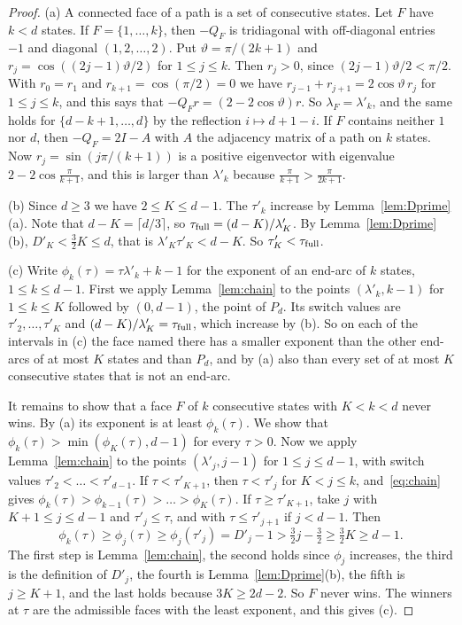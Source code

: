 \begin{proof}
(a) A connected face of a path is a set of consecutive states. Let $F$ have
$k<d$ states. If $F=\{1,\dots,k\}$, then $-Q_F$ is tridiagonal with
off-diagonal entries $-1$ and diagonal $(1,2,\dots,2)$. Put
$\vartheta=\pi/(2k+1)$ and $r_j=\cos((2j-1)\vartheta/2)$ for $1\le j\le k$.
Then $r_j>0$, since $(2j-1)\vartheta/2<\pi/2$. With $r_0=r_1$ and
$r_{k+1}=\cos(\pi/2)=0$ we have $r_{j-1}+r_{j+1}=2\cos\vartheta\,r_j$ for
$1\le j\le k$, and this says that $-Q_Fr=(2-2\cos\vartheta)r$. So
$\lambda_F=\lambda'_k$, and the same holds for $\{d-k+1,\dots,d\}$ by the
reflection $i\mapsto d+1-i$. If $F$ contains neither $1$ nor $d$, then
$-Q_F=2I-A$ with $A$ the adjacency matrix of a path on $k$ states. Now
$r_j=\sin(j\pi/(k+1))$ is a positive eigenvector with eigenvalue
$2-2\cos\frac\pi{k+1}$, and this is larger than $\lambda'_k$ because
$\frac\pi{k+1}>\frac\pi{2k+1}$.

(b) Since $d\ge3$ we have $2\le K\le d-1$. The $\tau'_k$ increase by
Lemma~\ref{lem:Dprime}(a). Note that $d-K=\lceil d/3\rceil$, so
$\tau_{\rm full}=(d-K)/\lambda'_K$. By Lemma~\ref{lem:Dprime}(b),
$D'_K<\frac32K\le d$, that is $\lambda'_K\tau'_K<d-K$. So
$\tau'_K<\tau_{\rm full}$.

(c) Write $\phi_k(\tau)=\tau\lambda'_k+k-1$ for the exponent of an end-arc of
$k$ states, $1\le k\le d-1$. First we apply Lemma~\ref{lem:chain} to the
points $(\lambda'_k,k-1)$ for $1\le k\le K$ followed by $(0,d-1)$, the point
of $P_d$. Its switch values are $\tau'_2,\dots,\tau'_K$ and
$(d-K)/\lambda'_K=\tau_{\rm full}$, which increase by (b). So on each of the
intervals in (c) the face named there has a smaller exponent than the other
end-arcs of at most $K$ states and than $P_d$, and by (a) also than every set
of at most $K$ consecutive states that is not an end-arc.

It remains to show that a face $F$ of $k$ consecutive states with
$K<k<d$ never wins. By (a) its exponent is at least $\phi_k(\tau)$. We show that
$\phi_k(\tau)>\min(\phi_K(\tau),d-1)$ for every $\tau>0$. Now we apply
Lemma~\ref{lem:chain} to the points $(\lambda'_j,j-1)$ for $1\le j\le d-1$,
with switch values $\tau'_2<\dots<\tau'_{d-1}$. If $\tau<\tau'_{K+1}$, then
$\tau<\tau'_j$ for $K<j\le k$, and~\eqref{eq:chain} gives
$\phi_k(\tau)>\phi_{k-1}(\tau)>\dots>\phi_K(\tau)$. If $\tau\ge\tau'_{K+1}$, take $j$
with $K+1\le j\le d-1$ and $\tau'_j\le\tau$, and with $\tau\le\tau'_{j+1}$ if
$j<d-1$. Then
\[
 \phi_k(\tau)\ge \phi_j(\tau)\ge \phi_j(\tau'_j)=D'_j-1>\tfrac32j-\tfrac32
 \ge\tfrac32K\ge d-1 .
\]
The first step is Lemma~\ref{lem:chain}, the second holds since $\phi_j$
increases, the third is the definition of $D'_j$, the fourth is
Lemma~\ref{lem:Dprime}(b), the fifth is $j\ge K+1$, and the last holds because
$3K\ge2d-2$. So $F$ never wins. The winners at $\tau$ are the admissible faces with the
least exponent, and this gives (c).
\end{proof}

